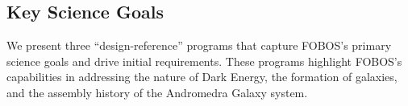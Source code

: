 \documentclass[oneside,11pt]{amsart}
\newcommand{\comment}[2][todo]{{\color{#1}[[{\bf #2}]]}}
\begin{document}

\subsection{Key Science Goals}
\label{sec:goals}

We present three ``design-reference'' programs that capture FOBOS's primary science goals and drive initial requirements.  These programs highlight FOBOS's capabilities in addressing the nature of Dark Energy, the formation of galaxies, and the assembly history of the Andromedra Galaxy system.  



\end{document}
